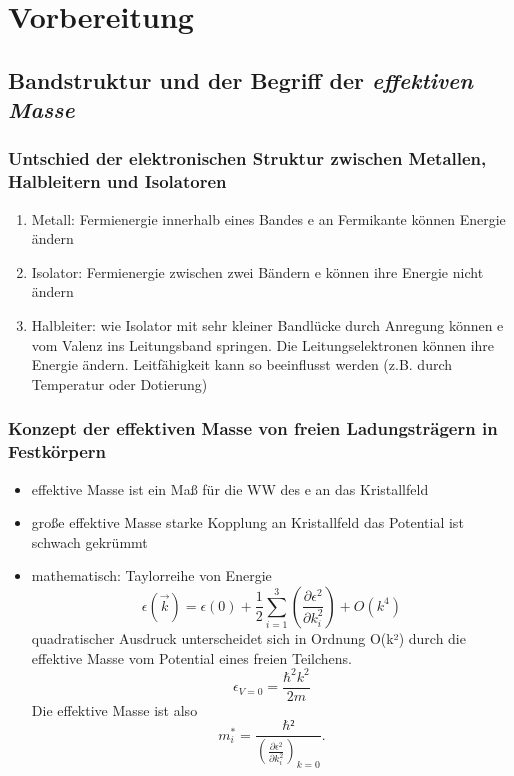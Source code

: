 \section{Vorbereitung}

\subsection{Bandstruktur und der Begriff der \textit{effektiven Masse}}

\subsubsection*{Untschied der elektronischen Struktur zwischen Metallen, Halbleitern und Isolatoren}
\begin{enumerate}
\item Metall:     
    Fermienergie innerhalb eines Bandes \to e an Fermikante können Energie ändern
\item Isolator:   
    Fermienergie zwischen zwei Bändern  \to e können ihre Energie nicht ändern
\item Halbleiter: 
    wie Isolator mit sehr kleiner Bandlücke \to durch Anregung können e vom Valenz ins Leitungsband springen.
    Die Leitungselektronen können ihre Energie ändern.
    Leitfähigkeit kann so beeinflusst werden (z.B. durch Temperatur oder Dotierung)
\end{enumerate}


\subsubsection*{Konzept der effektiven Masse von freien Ladungsträgern in Festkörpern}
\begin{itemize}
\item effektive Masse ist ein Maß für die WW des e an das Kristallfeld
\item große effektive Masse \iff starke Kopplung an Kristallfeld \to das Potential ist schwach gekrümmt
\item mathematisch: 
    Taylorreihe von Energie
    \begin{equation*}
        \epsilon(\vec{k})=\epsilon(0)+\frac{1}{2}\sum_{i=1}^3\left(\frac{\partial \epsilon^2}{\partial k_i^2}\right)+O(k^4)
    \end{equation*}
    quadratischer Ausdruck unterscheidet sich in Ordnung O(k²) durch die effektive Masse
    vom Potential eines freien Teilchens.
    \begin{equation*}
        \epsilon_{V=0}=\frac{\hbar^2 k^2}{2m}
    \end{equation*}
    Die effektive Masse ist also 
    \begin{equation*}
        m_i^*=\frac{\hbar²}{\left(\frac{\partial \epsilon^2}{\partial k_i^2}\right)_{k=0}}.
    \end{equation*}
\end{itemize}

